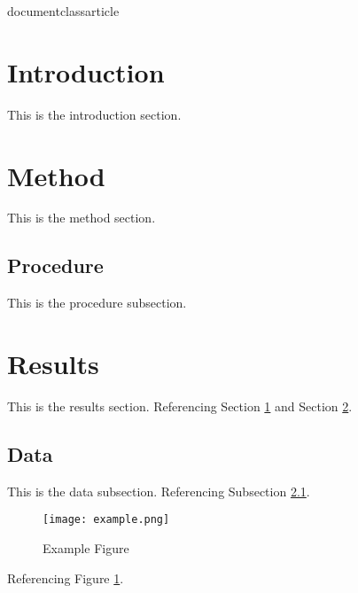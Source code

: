 documentclass{article}
\

\section{Introduction}\label{sec:intro}
This is the introduction section.
\section{Method}\label{sec:method}
This is the method section.
\subsection{Procedure}\label{subsec:procedure}
This is the procedure subsection.
\section{Results}\label{sec:results}
This is the results section. Referencing Section \ref{sec:intro} and Section
\ref{sec:method}.
\subsection{Data}\label{subsec:data}
This is the data subsection. Referencing Subsection \ref{subsec:procedure}.
\begin{figure}[htbp]
\centering
\texttt{[image: example.png]}
\caption{Example Figure}\label{fig:example}
\end{figure}
Referencing Figure \ref{fig:example}.
